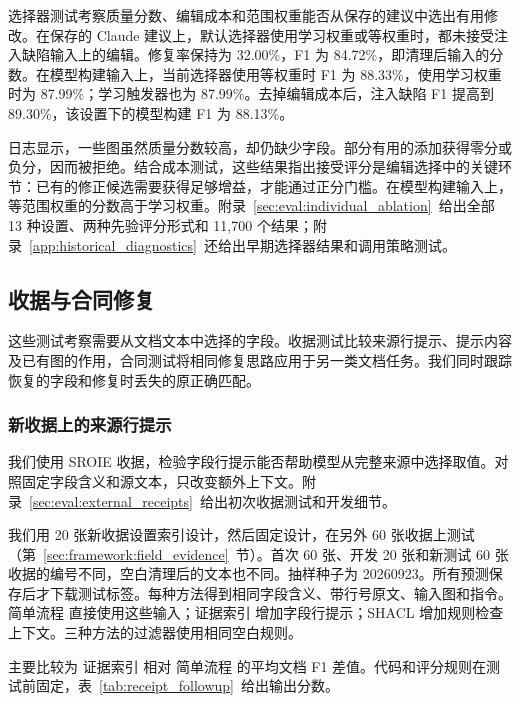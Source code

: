 选择器测试考察质量分数、编辑成本和范围权重能否从保存的建议中选出有用修改。在保存的 Claude 建议上，默认选择器使用学习权重或等权重时，都未接受注入缺陷输入上的编辑。修复率保持为 32.00\%，F1 为 84.72\%，即清理后输入的分数。在模型构建输入上，当前选择器使用等权重时 F1 为 88.33\%，使用学习权重时为 87.99\%；学习触发器也为 87.99\%。去掉编辑成本后，注入缺陷 F1 提高到 89.30\%，该设置下的模型构建 F1 为 88.13\%。

日志显示，一些图虽然质量分数较高，却仍缺少字段。部分有用的添加获得零分或负分，因而被拒绝。结合成本测试，这些结果指出接受评分是编辑选择中的关键环节：已有的修正候选需要获得足够增益，才能通过正分门槛。在模型构建输入上，等范围权重的分数高于学习权重。附录~\ref{sec:eval:individual_ablation}~给出全部 13 种设置、两种先验评分形式和 11,700 个结果；附录~\ref{app:historical_diagnostics}~还给出早期选择器结果和调用策略测试。

\subsection{收据与合同修复}
\label{sec:eval:documents}

这些测试考察需要从文档文本中选择的字段。收据测试比较来源行提示、提示内容及已有图的作用，合同测试将相同修复思路应用于另一类文档任务。我们同时跟踪恢复的字段和修复时丢失的原正确匹配。

\subsubsection{新收据上的来源行提示}
\label{sec:eval:receipt_followup}

我们使用 SROIE 收据\citep{ref_sroie2019}，检验字段行提示能否帮助模型从完整来源中选择取值。对照固定字段含义和源文本，只改变额外上下文。附录~\ref{sec:eval:external_receipts}~给出初次收据测试和开发细节。

我们用 20 张新收据设置索引设计，然后固定设计，在另外 60 张收据上测试（第~\ref{sec:framework:field_evidence}~节）。首次 60 张、开发 20 张和新测试 60 张收据的编号不同，空白清理后的文本也不同。抽样种子为 20260923。所有预测保存后才下载测试标签。每种方法得到相同字段含义、带行号原文、输入图和指令。简单流程 直接使用这些输入；证据索引 增加字段行提示；SHACL 增加规则检查上下文。三种方法的过滤器使用相同空白规则。

主要比较为 证据索引 相对 简单流程 的平均文档 F1 差值。代码和评分规则在测试前固定，表~\ref{tab:receipt_followup}~给出输出分数。

